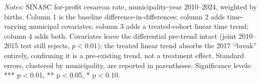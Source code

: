 
\begin{table}[H]
   \caption{\label{tab:pretrend_robustness} \textbf{\emph{Parto Adequado}: covariate and treated-trend robustness}}
   \centering
\small\setlength{\tabcolsep}{5pt}
   
   \par \raggedright 
   \footnotesize\textit{Notes:} SINASC for-profit cesarean rate, municipality-year 2010--2024, weighted by births. Column 1 is the baseline difference-in-differences; column 2 adds time-varying municipal covariates; column 3 adds a treated-cohort linear time trend; column 4 adds both. Covariates leave the differential pre-trend intact (joint 2010--2015 test still rejects, $p<0.01$); the treated linear trend absorbs the 2017 ``break'' entirely, confirming it is a pre-existing trend, not a treatment effect. Standard errors, clustered by municipality, are reported in parentheses. \footnotesize Significance levels: *** p$<$0.01, ** p$<$0.05, * p$<$0.10.
\end{table}


